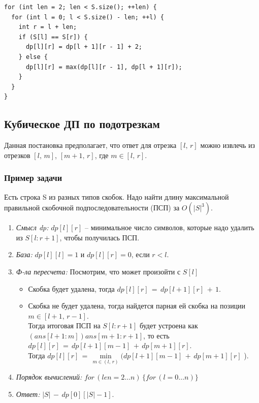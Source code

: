 \begin{lstlisting}
for (int len = 2; len < S.size(); ++len) {
  for (int l = 0; l < S.size() - len; ++l) {
    int r = l + len;
    if (S[l] == S[r]) {
      dp[l][r] = dp[l + 1][r - 1] + 2;
    } else {
      dp[l][r] = max(dp[l][r - 1], dp[l + 1][r]);
    }
  }
}
\end{lstlisting}

\subsection*{Кубическое ДП по подотрезкам}
Данная постановка предполагает, что ответ для отрезка $[l,\,r]$ можно извлечь из отрезков $[l,\,m]$, $[m + 1,\,r]$, где $m \in [l,\,r]$.

\subsubsection*{Пример задачи}
Есть строка S из разных типов скобок. Надо найти длину максимальной правильной скобочной подпоследовательности (ПСП) за $O(|S|^3)$.

\Solve

\begin{enumerate}
    \item \textit{Смысл dp:} $dp[l][r]$ -- минимальное число символов, которые надо удалить из $S[l:r + 1]$, чтобы получилась ПСП.
    \item \textit{База:} $dp[l][l] = 1$ и $dp[l][r] = 0$, если $r < l$.
    \item \textit{Ф-ла пересчета:} Посмотрим, что может произойти с $S[l]$
    \begin{itemize}
        \item Скобка будет удалена, тогда $dp[l][r]\,=\,dp[l+1][r]\,+\,1$.
        \item Скобка не будет удалена, тогда найдется парная ей скобка на
позиции $m \in [l + 1,\,r - 1]$.\\
Тогда итоговая ПСП на $S[l:r + 1]$ будет устроена как $(ans[l + 1 : m])ans[m + 1 : r + 1]$, то есть $dp[l][r]\,=\,dp[l + 1][m - 1]\,+\,dp[m + 1][r]$.\\
Тогда $dp[l][r]\,=\, \min\limits_{m \in (l,\,r)} ( dp[l + 1][m - 1]\,+\,dp[m + 1][r]$ ).
    \end{itemize}
    \item \textit{Порядок вычислений:} $for\,(len=2 \dots n)\, \{ for\,(l = 0 \dots n) \}$
    \item \textit{Ответ:} $|S|\,-\,dp[0][|S| - 1]$.
\end{enumerate}

